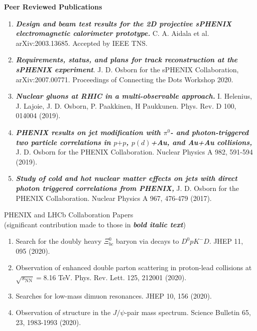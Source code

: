 \documentclass[11pt]{article}
\begin{document}
\begin{flushleft}

\vspace{7pt}
\Large\textbf{Peer Reviewed Publications}\\
\vspace{2pt}
\begin{center}
\normalsize
\begin{enumerate}
	\item \textbf{\textit{Design and beam test results for the 2D projective sPHENIX electromagnetic calorimeter prototype.}} C. A. Aidala et al.  arXiv:2003.13685. Accepted by IEEE TNS.
	
	\item\textbf{\textit{Requirements, status, and plans for track reconstruction at the sPHENIX experiment}}. J. D. Osborn for the sPHENIX Collaboration, arXiv:2007.00771. Proceedings of Connecting the Dots Workshop 2020.
	\item \textbf{\textit{Nuclear gluons at RHIC in a multi-observable approach.}} I. Helenius, J. Lajoie, J. D. Osborn, P. Paakkinen, H Paukkunen. Phys. Rev. D 100, 014004 (2019).
	\item \textbf{\textit{PHENIX results on jet modification with $\pi^0$- and photon-triggered two particle correlations in $p$$+$$p$, $p(d)$+Au, and Au+Au collisions,}} J. D. Osborn for the PHENIX Collaboration. Nuclear Physics A 982, 591-594 (2019).
	\item \textbf{\textit{Study of cold and hot nuclear matter effects on jets with direct photon triggered correlations from PHENIX,}} J. D. Osborn for the PHENIX Collaboration. Nuclear Physics A 967, 476-479 (2017).
\end{enumerate}

\vspace{14pt}
\begin{flushleft}
\large PHENIX and LHCb Collaboration Papers\\ (significant contribution made to those in \textbf{\textit{bold italic text}})\\
\end{flushleft}

\begin{enumerate}
	\normalsize
		\item Search for the doubly heavy $\mathit{\Xi}_{bc}^{0}$ baryon via decays to $D^0pK^-D$. JHEP 11, 095 (2020).
		\item Observation of enhanced double parton scattering in proton-lead collisions at $\sqrt{s_\mathrm{NN}}=$8.16 TeV. Phys. Rev. Lett. 125, 212001 (2020).
		\item Searches for low-mass dimuon resonances. JHEP 10, 156 (2020).
		\item Observation of structure in the $J/\psi$-pair mass spectrum. Science Bulletin 65, 23, 1983-1993 (2020).
		

\end{enumerate}
\end{center}
\end{flushleft}
\end{document}
